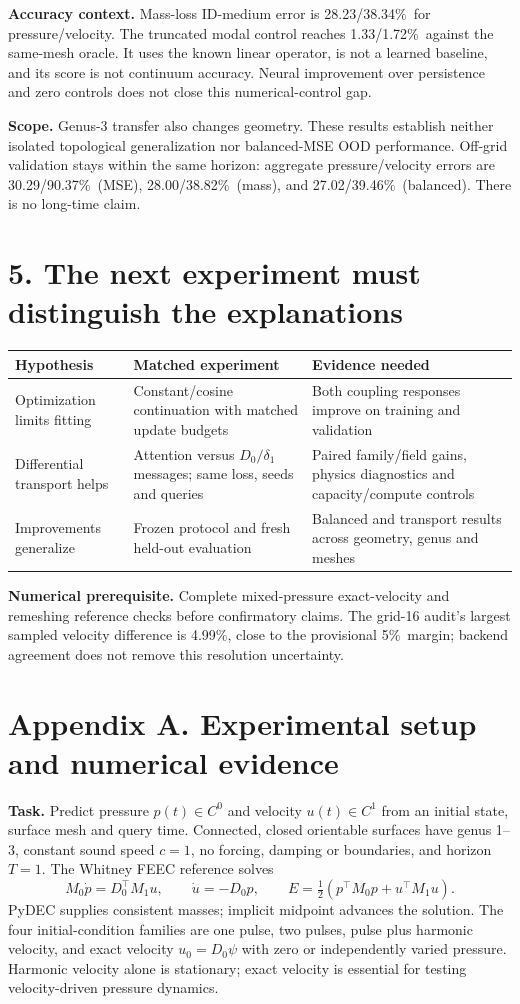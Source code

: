 \documentclass[10pt,a4paper]{article}
\newcommand{\pct}{\%}
\begin{document}
\textbf{Accuracy context.} Mass-loss ID-medium error is 28.23/38.34\pct\ for
pressure/velocity. The truncated modal control reaches 1.33/1.72\pct\ against the
same-mesh oracle. It uses the known linear operator, is not a learned baseline,
and its score is not continuum accuracy. Neural improvement over persistence and
zero controls does not close this numerical-control gap.

\textbf{Scope.} Genus-3 transfer also changes geometry. These results establish
neither isolated topological generalization nor balanced-MSE OOD performance.
Off-grid validation stays within the same horizon: aggregate pressure/velocity
errors are 30.29/90.37\pct\ (MSE), 28.00/38.82\pct\ (mass), and
27.02/39.46\pct\ (balanced). There is no long-time claim.

\section*{5. The next experiment must distinguish the explanations}
\begin{tabularx}{\linewidth}{@{}>{\raggedright\arraybackslash}p{31mm}XX@{}}
\toprule
Hypothesis & Matched experiment & Evidence needed\\\midrule
Optimization limits fitting & Constant/cosine continuation with matched update budgets & Both coupling responses improve on training and validation\\
Differential transport helps & Attention versus $D_0/\delta_1$ messages; same loss, seeds and queries & Paired family/field gains, physics diagnostics and capacity/compute controls\\
Improvements generalize & Frozen protocol and fresh held-out evaluation & Balanced and transport results across geometry, genus and meshes\\
\bottomrule
\end{tabularx}

\textbf{Numerical prerequisite.} Complete mixed-pressure exact-velocity and remeshing
reference checks before confirmatory claims. The grid-16 audit's largest sampled
velocity difference is 4.99\pct, close to the provisional 5\pct\ margin; backend
agreement does not remove this resolution uncertainty.
\clearpage\section*{Appendix A. Experimental setup and numerical evidence}

\textbf{Task.} Predict pressure $p(t)\in C^0$ and velocity $u(t)\in C^1$ from an
initial state, surface mesh and query time. Connected, closed orientable surfaces
have genus 1--3, constant sound speed $c=1$, no forcing, damping or boundaries,
and horizon $T=1$. The Whitney FEEC reference solves
\[
 M_0\dot p=D_0^\top M_1u,\qquad \dot u=-D_0p,
 \qquad E=\tfrac12(p^\top M_0p+u^\top M_1u).
\]
PyDEC supplies consistent masses; implicit midpoint advances the solution.
The four initial-condition families are one pulse, two pulses, pulse plus harmonic
velocity, and exact velocity $u_0=D_0\psi$ with zero or independently varied pressure.
Harmonic velocity alone is stationary; exact velocity is essential for testing
velocity-driven pressure dynamics.
\end{document}
